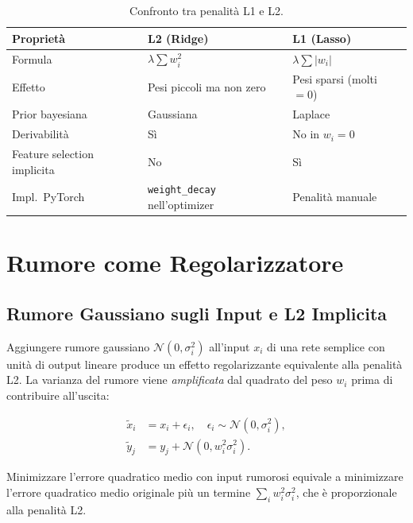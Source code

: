 \begin{table}[H]
  \centering
  \caption{Confronto tra penalità L1 e L2.}
  \label{tab:l1-vs-l2}
  \small
  \begin{tabularx}{\linewidth}{l X X}
    \toprule
    \textbf{Proprietà} & \textbf{L2 (Ridge)} & \textbf{L1 (Lasso)} \\
    \midrule
    Formula & $\lambda\sum w_i^2$ & $\lambda\sum |w_i|$ \\
    Effetto & Pesi piccoli ma non zero & Pesi sparsi (molti $= 0$) \\
    Prior bayesiana & Gaussiana & Laplace \\
    Derivabilità & Sì & No in $w_i=0$ \\
    Feature selection implicita & No & Sì \\
    Impl.\ PyTorch & \texttt{weight\_decay} nell'optimizer & Penalità manuale \\
    \bottomrule
  \end{tabularx}
\end{table}

\section{Rumore come Regolarizzatore}
\label{sec:noise-regularizer}

\subsection{Rumore Gaussiano sugli Input e L2 Implicita}
\label{subsec:gaussian-noise}

Aggiungere rumore gaussiano $\mathcal{N}(0, \sigma_i^2)$ all'input $x_i$ di
una rete semplice con unità di output lineare produce un effetto
regolarizzante equivalente alla penalità L2. La varianza del rumore viene
\emph{amplificata} dal quadrato del peso $w_i$ prima di contribuire all'uscita:

\begin{align}
  \tilde{x}_i &= x_i + \epsilon_i, \quad \epsilon_i \sim \mathcal{N}(0,\sigma_i^2),
  \label{eq:noisy-input} \\
  \tilde{y}_j &= y_j + \mathcal{N}(0, w_i^2 \sigma_i^2).
  \label{eq:noisy-output}
\end{align}

Minimizzare l'errore quadratico medio con input rumorosi equivale a minimizzare
l'errore quadratico medio originale più un termine $\sum_i w_i^2 \sigma_i^2$,
che è proporzionale alla penalità L2.

